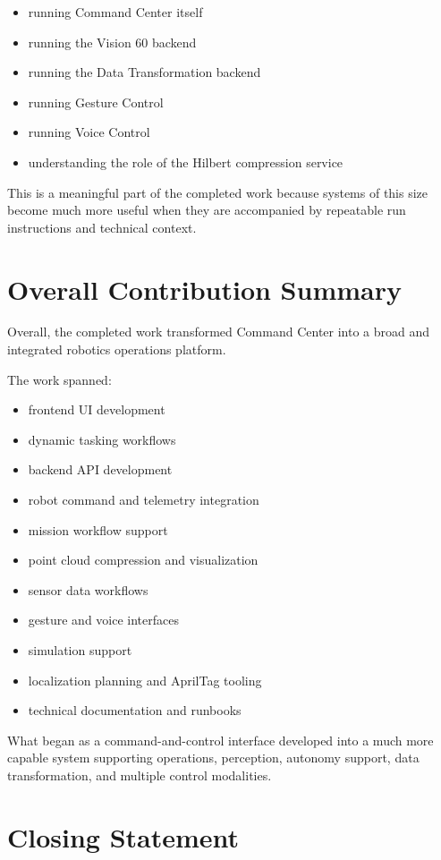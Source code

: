 \documentclass[11pt]{article}
\begin{document}
\begin{itemize}
  \item running Command Center itself
  \item running the Vision 60 backend
  \item running the Data Transformation backend
  \item running Gesture Control
  \item running Voice Control
  \item understanding the role of the Hilbert compression service
\end{itemize}

This is a meaningful part of the completed work because systems of this size become much more useful when they are accompanied by repeatable run instructions and technical context.

\section{Overall Contribution Summary}

Overall, the completed work transformed Command Center into a broad and integrated robotics operations platform.

The work spanned:

\begin{itemize}
  \item frontend UI development
  \item dynamic tasking workflows
  \item backend API development
  \item robot command and telemetry integration
  \item mission workflow support
  \item point cloud compression and visualization
  \item sensor data workflows
  \item gesture and voice interfaces
  \item simulation support
  \item localization planning and AprilTag tooling
  \item technical documentation and runbooks
\end{itemize}

What began as a command-and-control interface developed into a much more capable system supporting operations, perception, autonomy support, data transformation, and multiple control modalities.

\section{Closing Statement}
\end{document}
